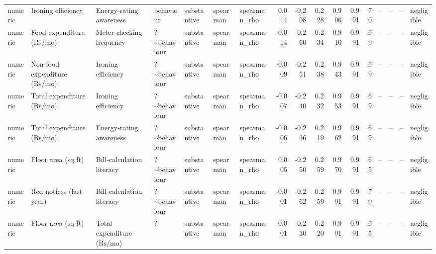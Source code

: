 \begin{table}
\begin{tabular}{lllllllrrrrrrrrrl}
numeric & Ironing efficiency & Energy-rating awareness & behaviour & substantive & spearman & spearman\_rho & 0.014 & -0.208 & 0.228 & 0.906 & 0.991 & 70 & -- & -- & -- & negligible \\
numeric & Food expenditure (Rs/mo) & Meter-checking frequency & ?\textasciitilde behaviour & substantive & spearman & spearman\_rho & -0.014 & -0.260 & 0.234 & 0.910 & 0.991 & 69 & -- & -- & -- & negligible \\
numeric & Non-food expenditure (Rs/mo) & Ironing efficiency & ?\textasciitilde behaviour & substantive & spearman & spearman\_rho & -0.009 & -0.251 & 0.238 & 0.943 & 0.991 & 69 & -- & -- & -- & negligible \\
numeric & Total expenditure (Rs/mo) & Ironing efficiency & ?\textasciitilde behaviour & substantive & spearman & spearman\_rho & -0.007 & -0.240 & 0.232 & 0.953 & 0.991 & 69 & -- & -- & -- & negligible \\
numeric & Total expenditure (Rs/mo) & Energy-rating awareness & ?\textasciitilde behaviour & substantive & spearman & spearman\_rho & -0.006 & -0.236 & 0.219 & 0.962 & 0.991 & 69 & -- & -- & -- & negligible \\
numeric & Floor area (sq ft) & Bill-calculation literacy & ?\textasciitilde behaviour & substantive & spearman & spearman\_rho & 0.005 & -0.250 & 0.259 & 0.970 & 0.991 & 65 & -- & -- & -- & negligible \\
numeric & Red notices (last year) & Bill-calculation literacy & ?\textasciitilde behaviour & substantive & spearman & spearman\_rho & -0.001 & -0.262 & 0.259 & 0.991 & 0.991 & 70 & -- & -- & -- & negligible \\
numeric & Floor area (sq ft) & Total expenditure (Rs/mo) & ? & substantive & spearman & spearman\_rho & -0.001 & -0.230 & 0.220 & 0.991 & 0.991 & 65 & -- & -- & -- & negligible \\
\bottomrule
\end{tabular}
\end{table}

